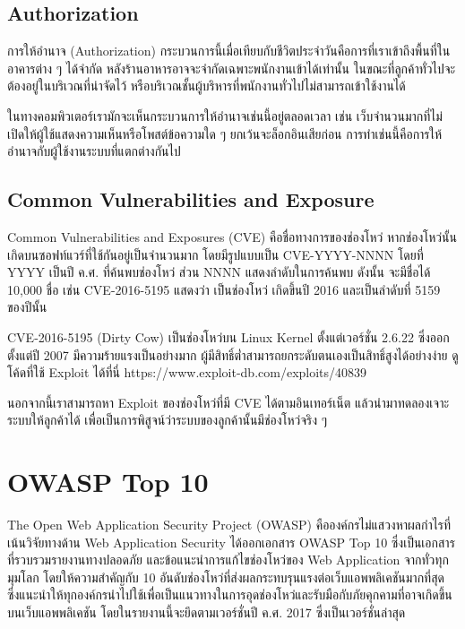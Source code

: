 \subsection{Authorization}

การให้อำนาจ (Authorization) กระบวนการนี้เมื่อเทียบกับชีวิตประจำวันคือการที่เราเข้าถึงพื้นที่ในอาคารต่าง ๆ ได้จำกัด หลังร้านอาหารอาจจะจำกัดเฉพาะพนักงานเข้าได้เท่านั้น ในขณะที่ลูกค้าทั่วไปจะต้องอยู่ในบริเวณที่น่าจัดไว้ หรือบริเวณชั้นผู้บริหารที่พนักงานทั่วไปไม่สามารถเข้าใช้งานได้ 

ในทางคอมพิวเตอร์เรามักจะเห็นกระบวนการให้อำนาจเช่นนี้อยู่ตลอดเวลา เช่น เว็บจำนวนมากที่ไม่เปิดให้ผู้ใช้แสดงความเห็นหรือโพสต์ข้อความใด ๆ ยกเว้นจะล็อกอินเสียก่อน การทำเช่นนี้คือการให้อำนาจกับผู้ใช้งานระบบที่แตกต่างกันไป

\subsection{Common Vulnerabilities and Exposure} \label{cve}

Common Vulnerabilities and Exposures (CVE) \cite{cve-mitre} คือชื่อทางการของช่องโหว่ หากช่องโหว่นั้นเกิดบนซอฟท์แวร์ที่ใช้กันอยู่เป็นจำนวนมาก โดยมีรูปแบบเป็น CVE-YYYY-NNNN โดยที่ YYYY เป็นปี ค.ศ. ที่ค้นพบช่องโหว่ ส่วน NNNN แสดงลำดับในการค้นพบ ดังนั้น จะมีชื่อได้ 10,000 ชื่อ เช่น CVE-2016-5195  \cite{dirtycow} แสดงว่า เป็นช่องโหว่ เกิดขึ้นปี 2016 และเป็นลำดับที่ 5159 ของปีนั้น

CVE-2016-5195 (Dirty Cow) เป็นช่องโหว่บน Linux Kernel ตั้งแต่เวอร์ชั่น 2.6.22 ซึ่งออกตั้งแต่ปี 2007 มีความร้ายแรงเป็นอย่างมาก ผู้มีสิทธิ์ต่ำสามารถยกระดับตนเองเป็นสิทธิ์สูงได้อย่างง่าย ดูโค้ดที่ใช้ Exploit ได้ที่นี่ https://www.exploit-db.com/exploits/40839

นอกจากนี้เราสามารถหา Exploit ของช่องโหว่ที่มี CVE ได้ตามอินเทอร์เน็ต แล้วนำมาทดลองเจาะระบบให้ลูกค้าได้ เพื่อเป็นการพิสูจน์ว่าระบบของลูกค้านั้นมีช่องโหว่จริง ๆ

\section{OWASP Top 10}

The Open Web Application Security Project (OWASP) คือองค์กรไม่แสวงหาผลกำไรที่เน้นวิจัยทางด้าน Web Application Security ได้ออกเอกสาร OWASP Top 10 ซึ่งเป็นเอกสารที่รวบรวมรายงานทางปลอดภัย และข้อแนะนำการแก้ไขช่องโหว่ของ Web Application จากทั่วทุกมุมโลก โดยให้ความสำคัญกับ 10 อันดับช่องโหว่ที่ส่งผลกระทบรุนแรงต่อเว็บแอพพลิเคชันมากที่สุด ซึ่งแนะนำให้ทุกองค์กรนำไปใช้เพื่อเป็นแนวทางในการอุดช่องโหว่และรับมือกับภัยคุกคามที่อาจเกิดขึ้นบนเว็บแอพพลิเคชัน โดยในรายงานนี้จะยึดตามเวอร์ชั่นปี ค.ศ. 2017 ซึ่งเป็นเวอร์ชั่นล่าสุด \cite{owasp_2017}


